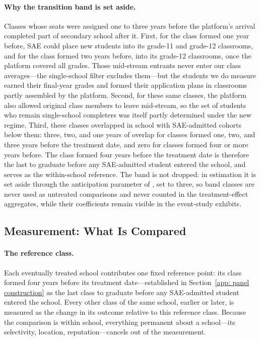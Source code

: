 \paragraph{Why the transition band is set aside.}
Classes whose seats were assigned one to three years before the platform's arrival completed part of secondary school after it. First, for the class formed one year before, SAE could place new students into its grade-11 and grade-12 classrooms, and for the class formed two years before, into its grade-12 classrooms, once the platform covered all grades. Those mid-stream entrants never enter our class averages---the single-school filter excludes them---but the students we do measure earned their final-year grades and formed their application plans in classrooms partly assembled by the platform. Second, for these same classes, the platform also allowed original class members to leave mid-stream, so the set of students who remain single-school completers was itself partly determined under the new regime. Third, these classes overlapped in school with SAE-admitted cohorts below them: three, two, and one years of overlap for classes formed one, two, and three years before the treatment date, and zero for classes formed four or more years before. The class formed four years before the treatment date is therefore the last to graduate before any SAE-admitted student entered the school, and serves as the within-school reference. The band is not dropped: in estimation it is set aside through the anticipation parameter of \citet{callaway2021}, set to three, so band classes are never used as untreated comparisons and never counted in the treatment-effect aggregates, while their coefficients remain visible in the event-study exhibits.

\subsection{Measurement: What Is Compared}\label{app: measurement}

\paragraph{The reference class.}
Each eventually treated school contributes one fixed reference point: its class formed four years before its treatment date---established in Section~\ref{app: panel construction} as the last class to graduate before any SAE-admitted student entered the school. Every other class of the same school, earlier or later, is measured as the change in its outcome relative to this reference class. Because the comparison is within school, everything permanent about a school---its selectivity, location, reputation---cancels out of the measurement.

